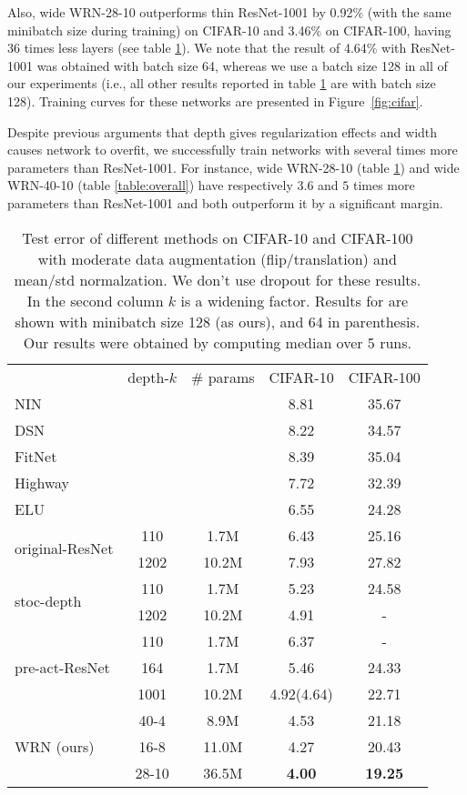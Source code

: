 \documentclass{bmvc2k}
\begin{document}
Also, wide WRN-28-10 outperforms thin ResNet-1001 by 0.92\% (with the same minibatch size during training) on CIFAR-10 and 3.46\% on CIFAR-100, having 36 times less layers (see table \ref{table:final}). We note that the result of 4.64\% with ResNet-1001 was obtained with batch size 64, whereas  we use a batch size 128 in all of our experiments (i.e., all other results reported in table \ref{table:final} are with batch size 128). Training curves for these networks are presented in Figure~\ref{fig:cifar}.

Despite previous arguments that depth gives regularization effects and width causes network to overfit, we successfully train networks with several times more parameters than ResNet-1001. For instance, wide WRN-28-10 (table \ref{table:final}) and wide WRN-40-10 (table \ref{table:overall}) have respectively $3.6$ and $5$ times more parameters than ResNet-1001 and both outperform it by a significant margin.

\begin{table}[ht]
  \centering
  \begin{tabular}{l|cccc}
    \hline
& depth-$k$ & \# params & CIFAR-10 & CIFAR-100 \\
\Xhline{2\arrayrulewidth}
NIN \cite{nin} & & & 8.81 & 35.67 \\
DSN \cite{dsn} & & & 8.22 & 34.57 \\
FitNet \cite{Romero-et-al-TR2014} & & & 8.39 & 35.04 \\
Highway \cite{highway} & & & 7.72 & 32.39 \\
ELU \cite{ELU} & & & 6.55 & 24.28 \\
\hline
\multirow{2}{*}{original-ResNet\cite{he2015deep}} & 110 & 1.7M & 6.43 & 25.16 \\
& 1202 & 10.2M & 7.93 & 27.82 \\
\hline
\multirow{2}{*}{stoc-depth\cite{stochastic_depth}} & 110 & 1.7M  & 5.23 & 24.58 \\
& 1202 & 10.2M & 4.91 & - \\
\hline
\multirow{3}{*}{pre-act-ResNet\cite{basicblock2}} & 110 & 1.7M & 6.37 & -\\
& 164 & 1.7M & 5.46 & 24.33 \\
& 1001 & 10.2M & 4.92(4.64) & 22.71 \\
\hline
\multirow{3}{*}{WRN (ours)} & 40-4 & 8.9M & 4.53 & 21.18 \\
& 16-8 & 11.0M & 4.27 & 20.43 \\
& 28-10 & 36.5M & \textbf{4.00} & \textbf{19.25} \\
\hline
  \end{tabular}
  \vspace{0.1cm}
  \caption{Test error of different methods on CIFAR-10 and CIFAR-100 with moderate data augmentation (flip/translation) and mean/std normalzation. We don't use dropout for these results. In the second column $k$ is a widening factor. Results for \cite{basicblock2} are shown with minibatch size 128 (as ours), and 64 in parenthesis. Our results were obtained by computing median over 5 runs.}
  \label{table:final}
  \vspace{-0.2cm}
\end{table}
\end{document}
